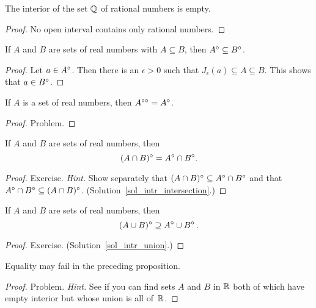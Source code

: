 \begin{exam} The interior of the set $\mathbb{Q}$ of rational numbers is empty.
\end{exam}

\begin{proof} No open interval contains only rational numbers.
\end{proof}

\begin{prop}\label{intr_subsets} If $A$ and $B$ are sets of real numbers with $A \subseteq B$,
then $A^{\circ} \subseteq B^{\circ}$.
\end{prop}

\begin{proof} Let $a \in A^{\circ}$.  Then there is an $\epsilon > 0$ such that $J_\epsilon(a)
\subseteq A \subseteq B$.  This shows that $a \in B^{\circ}$.
\end{proof}

\begin{prop} If $A$ is a set of real numbers, then $A^{\circ\circ} = A^{\circ}$.
\end{prop}

\begin{proof} Problem.  \ns  \end{proof}

\begin{prop}\label{intr_intersection} If $A$ and $B$ are sets of real numbers, then
  \[(A \cap B)^{\circ} = A^{\circ} \cap B^{\circ}.\]
\end{prop}

\begin{proof} Exercise.  \emph{Hint.}  Show separately that $(A \cap B)^{\circ} \subseteq
A^{\circ} \cap B^{\circ}$ and that $A^{\circ} \cap B^{\circ} \subseteq (A \cap B)^{\circ}$.
(Solution~\ref{sol_intr_intersection}.) \ns
\end{proof}

\begin{prop}\label{intr_union} If $A$ and $B$ are sets of real numbers, then
   \[ (A \cup B)^{\circ} \supseteq A^{\circ} \cup B^{\circ}\,. \]
\end{prop}

\begin{proof} Exercise. (Solution~\ref{sol_intr_union}.) \ns \end{proof}

\begin{exam} Equality may fail in the preceding proposition.
\end{exam}

\begin{proof} Problem.  \emph{Hint.}  See if you can find sets $A$ and $B$ in $\mathbb{R}$ both of
which have empty interior but whose union is all of~$\mathbb{R}$.  \ns
\end{proof}


\endinput
